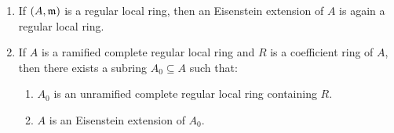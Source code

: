 \begin{theorem}
\begin{enumerate}[label=(\arabic*)]
    \item If $(A,\mathfrak{m})$ is a regular local ring, then an Eisenstein extension of $A$ is again a regular local ring. 
    \item If $A$ is a ramified complete regular local ring and $R$ is a coefficient ring of $A$, then there exists a subring $A_0\subseteq A$ such that: 
    \begin{enumerate}[label=(\roman*)]
        \item $A_0$ is an unramified complete regular local ring containing $R$.
        \item $A$ is an Eisenstein extension of $A_0$.
    \end{enumerate}
\end{enumerate}
\end{theorem}
